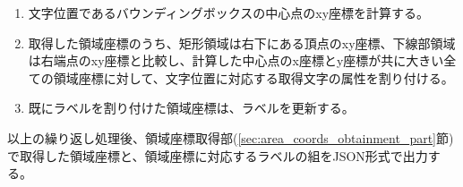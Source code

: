 \begin{enumerate}
    \item 文字位置であるバウンディングボックスの中心点のxy座標を計算する。
    \item 取得した領域座標のうち、矩形領域は右下にある頂点のxy座標、下線部領域は右端点のxy座標と比較し、計算した中心点のx座標とy座標が共に大きい全ての領域座標に対して、文字位置に対応する取得文字の属性を割り付ける。
    \item 既にラベルを割り付けた領域座標は、ラベルを更新する。
\end{enumerate}

以上の繰り返し処理後、領域座標取得部(\ref{sec:area_coords_obtainment_part}節)で取得した領域座標と、領域座標に対応するラベルの組をJSON形式で出力する。
